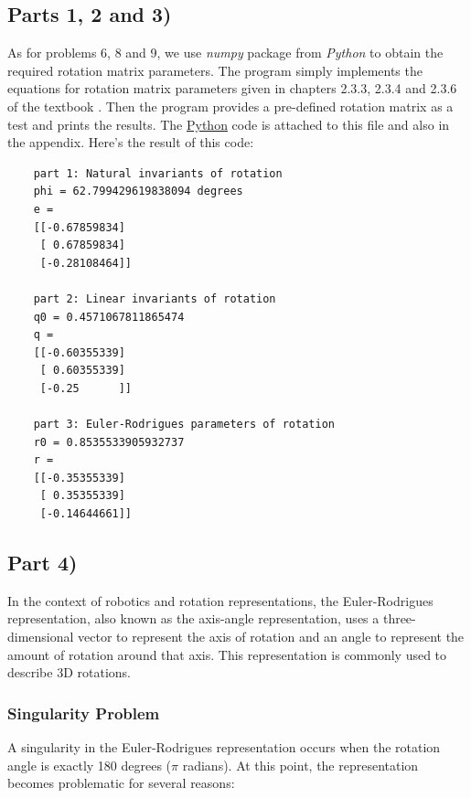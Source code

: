\documentclass[conference]{IEEEtran}
\begin{document}
\subsection*{Parts 1, 2 and 3)}
As for problems 6, 8 and 9, we use \textit{numpy} package from \textit{Python} to obtain the required rotation matrix parameters. The program simply implements the equations for rotation matrix parameters given in chapters 2.3.3, 2.3.4 and 2.3.6 of the textbook \cite{b1}. Then the program provides a pre-defined rotation matrix as a test and prints the results. The \underline{Python} code is attached to this file and also in the appendix. Here's the result of this code:
\scriptsize
\begin{verbatim}
    part 1: Natural invariants of rotation
    phi = 62.799429619838094 degrees
    e =
    [[-0.67859834]
     [ 0.67859834]
     [-0.28108464]]

    part 2: Linear invariants of rotation
    q0 = 0.4571067811865474
    q =
    [[-0.60355339]
     [ 0.60355339]
     [-0.25      ]]

    part 3: Euler-Rodrigues parameters of rotation
    r0 = 0.8535533905932737
    r =
    [[-0.35355339]
     [ 0.35355339]
     [-0.14644661]]
\end{verbatim}

\subsection*{Part 4)}
In the context of robotics and rotation representations, the Euler-Rodrigues representation, also known as the axis-angle representation, uses a three-dimensional vector to represent the axis of rotation and an angle to represent the amount of rotation around that axis. This representation is commonly used to describe 3D rotations.

\vspace{10px}
\subsubsection{Singularity Problem}
A singularity in the Euler-Rodrigues representation occurs when the rotation angle is exactly 180 degrees (\(\pi\) radians). At this point, the representation becomes problematic for several reasons:
\end{document}
